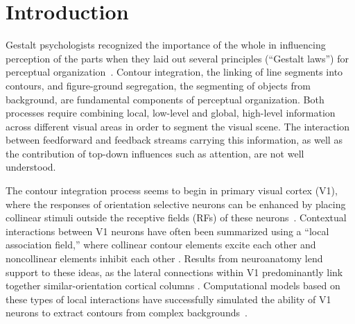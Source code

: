 \section{Introduction}
\label{intro}
%
Gestalt psychologists recognized the importance of the whole in
influencing perception of the parts
 when they laid out several principles 
 (``Gestalt laws'')
  for perceptual
organization~\citep{Wertheimer23,Koffka35}. Contour integration, the linking of line segments into contours, and figure-ground segregation, the segmenting of objects from background, are fundamental components of perceptual organization. Both processes require combining local, low-level and global, high-level information across different visual areas in order to segment the visual scene. The interaction between feedforward and feedback streams carrying this information, as well as the contribution of top-down influences such as attention, are not well understood.

The contour integration process seems to begin in primary visual cortex (V1), where the responses of orientation selective neurons can be enhanced by placing collinear stimuli outside the receptive fields (RFs) of these neurons~\citep{Stemmler_etal95a,Polat_etal98}.  Contextual interactions between V1 neurons have often been summarized using a ``local association field,'' where collinear contour elements excite each other and noncollinear elements inhibit each other \citep{Ullman92, Field_etal93}.  
Results from neuroanatomy lend support to these ideas, as the lateral connections within V1 predominantly link together similar-orientation cortical columns \citep{Gilbert_Wiesel89,Bosking_etal97,
  Stettler_etal02}.  Computational models based on these types of
local interactions have successfully simulated the ability of V1
neurons to extract contours from complex
backgrounds~\citep{Li98,Yen_Finkel98,Piech_etal13}. 

